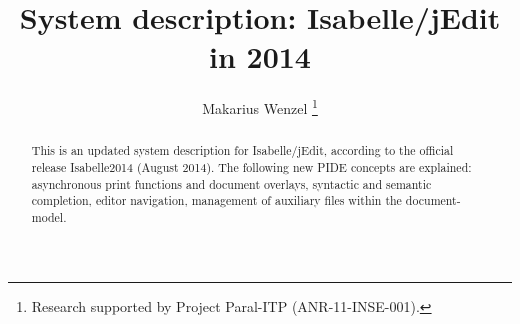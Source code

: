 \documentclass[submission,copyright,creativecommons]{eptcs}
\begin{document}
\title{System description: Isabelle/jEdit in 2014}
\author{Makarius Wenzel \thanks{Research supported by Project
    Paral-ITP (ANR-11-INSE-001).}
}
\def\titlerunning{Isabelle/jEdit in 2014}
\def\authorrunning{M. Wenzel}
\maketitle

\begin{abstract}
  This is an updated system description for Isabelle/jEdit, according to the
  official release Isabelle2014 (August 2014). The following new PIDE
  concepts are explained: asynchronous print functions and document
  overlays, syntactic and semantic completion, editor navigation,
  management of auxiliary files within the document-model.
\end{abstract}





\end{document}
